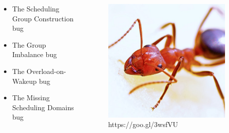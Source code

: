 \documentclass{beamer}
\newcommand{\linespace}{\vskip 0.25cm}
\begin{document}
\begin{frame}
\begin{columns}
\begin{column}{0.72\textwidth}
\linespace
\begin{itemize}
	\item The Scheduling Group Construction bug
	\item The Group Imbalance bug
	\item The Overload-on-Wakeup bug
	\item The Missing Scheduling Domains bug
\end{itemize}
\end{column}
\begin{column}[b]{0.28\textwidth} %
\begin{figure}
\centering
\includegraphics[width=0.95\textwidth]{Illustrations/ant_from_pexels.png}
\caption*{https://goo.gl/3wsfVU}
\end{figure}
\end{column}
\end{columns}
\end{frame}
\end{document}
